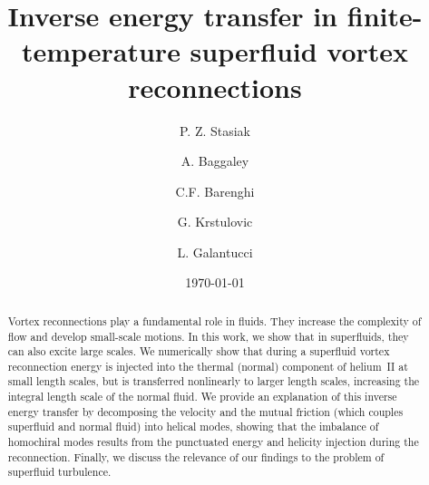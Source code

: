 \documentclass[%
 reprint,
 amsmath,amssymb,
 aps,
 prl,
]{revtex4-2}
\begin{document}

\title{Inverse energy transfer in finite-temperature superfluid vortex reconnections}

\author{P. Z. Stasiak}
\author{A. Baggaley}
\author{C.F. Barenghi}

\author{G. Krstulovic}

\author{L. Galantucci}

\date{\today}%

\begin{abstract}
Vortex reconnections play a fundamental role in fluids.
They increase the complexity of flow and develop small-scale motions.
In this work, we show that in superfluids, they can also excite large scales.
We numerically show that during a superfluid vortex reconnection energy 
is injected 
into the thermal (normal) component of helium~II at small length scales, but is transferred nonlinearly  to larger length scales, increasing the integral length scale of the normal
fluid.  We provide an explanation of this inverse energy transfer by decomposing the velocity and the mutual friction (which couples superfluid and normal fluid) into helical modes, showing 
that the imbalance of homochiral modes results from the punctuated energy and helicity injection during the reconnection. Finally, we discuss the relevance of our findings to 
the problem of superfluid turbulence.
\end{abstract}

\maketitle
\end{document}
